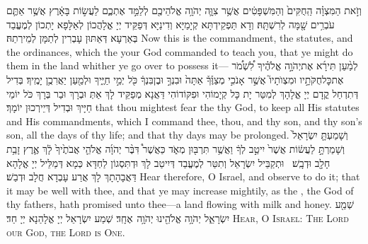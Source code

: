 \newperek
{}%
{וְזֹ֣את הַמִּצְוָ֗ה הַֽחֻקִּים֙ וְהַמִּשְׁפָּטִ֔ים אֲשֶׁ֥ר צִוָּ֛ה יְהֹוָ֥ה אֱלֹהֵיכֶ֖ם לְלַמֵּ֣ד אֶתְכֶ֑ם לַעֲשׂ֣וֹת בָּאָ֔רֶץ אֲשֶׁ֥ר אַתֶּ֛ם עֹבְרִ֥ים שָׁ֖מָּה לְרִשְׁתָּֽהּ׃}
{וְדָא תַּפְקֵידְתָּא קְיָמַיָּא וְדִינַיָּא דְּפַקֵּיד יְיָ אֱלָהֲכוֹן לְאַלָּפָא יָתְכוֹן לְמֶעֱבַד בְּאַרְעָא דְּאַתּוּן עָבְרִין לְתַמָּן לְמֵירְתַהּ׃}
{Now this is the commandment, the statutes, and the ordinances, which the \lord\space your God commanded to teach you, that ye might do them in the land whither ye go over to possess it—}{}
{לְמַ֨עַן תִּירָ֜א אֶת\maqqaf יְהֹוָ֣ה אֱלֹהֶ֗יךָ לִ֠שְׁמֹ֠ר אֶת\maqqaf כׇּל\maqqaf חֻקֹּתָ֣יו וּמִצְוֺתָיו֮ אֲשֶׁ֣ר אָנֹכִ֣י מְצַוֶּ֒ךָ֒ אַתָּה֙ וּבִנְךָ֣ וּבֶן\maqqaf בִּנְךָ֔ כֹּ֖ל יְמֵ֣י חַיֶּ֑יךָ וּלְמַ֖עַן יַאֲרִכֻ֥ן יָמֶֽיךָ׃}
{בְּדִיל דְּתִדְחַל קֳדָם יְיָ אֱלָהָךְ לְמִטַּר יָת כָּל קְיָמוֹהִי וּפִקּוֹדוֹהִי דַּאֲנָא מְפַקֵּיד לָךְ אַתְּ וּבְרָךְ וּבַר בְּרָךְ כֹּל יוֹמֵי חַיָּיךְ וּבְדִיל דְּיֵירְכוּן יוֹמָךְ׃}
{that thou mightest fear the \lord\space thy God, to keep all His statutes and His commandments, which I command thee, thou, and thy son, and thy son’s son, all the days of thy life; and that thy days may be prolonged.}{}
{וְשָׁמַעְתָּ֤ יִשְׂרָאֵל֙ וְשָׁמַרְתָּ֣ לַעֲשׂ֔וֹת אֲשֶׁר֙ יִיטַ֣ב לְךָ֔ וַאֲשֶׁ֥ר תִּרְבּ֖וּן מְאֹ֑ד כַּאֲשֶׁר֩ דִּבֶּ֨ר יְהֹוָ֜ה אֱלֹהֵ֤י אֲבֹתֶ֙יךָ֙ לָ֔ךְ אֶ֛רֶץ זָבַ֥ת חָלָ֖ב וּדְבָֽשׁ׃ \petucha }
{וּתְקַבֵּיל יִשְׂרָאֵל וְתִטַּר לְמֶעֱבַד דְּיִיטַב לָךְ וּדְתִּסְגוֹן לַחְדָּא כְּמָא דְּמַלֵּיל יְיָ אֱלָהָא דַּאֲבָהָתָךְ לָךְ אֲרַע עָבְדָא חֲלָב וּדְבַשׁ׃}
{Hear therefore, O Israel, and observe to do it; that it may be well with thee, and that ye may increase mightily, as the \lord, the God of thy fathers, hath promised unto thee—a land flowing with milk and honey.}{}
{שְׁמַ֖\large{ע} יִשְׂרָאֵ֑ל יְהֹוָ֥ה אֱלֹהֵ֖ינוּ יְהֹוָ֥ה \pasek  אֶחָֽ\large{ד}׃}
{שְׁמַע יִשְׂרָאֵל יְיָ אֱלָהַנָא יְיָ חַד׃}
{\textsc{Hear, O Israel: The Lord our God, the Lord is One.}}{}
